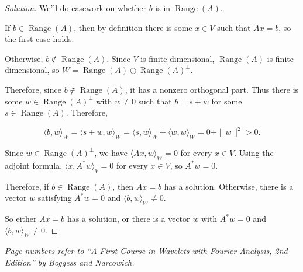 \documentclass[11pt]{article}
\newcommand{\1}{\mathbf{1}}
\theoremstyle{definition}
\newenvironment{solution}{\begin{proof}[Solution]}{\end{proof}}
\begin{document}
\begin{solution}
We'll do casework on whether $b$ is in $\operatorname{Range}(A)$.

\par If $b\in\operatorname{Range}(A)$, then by definition there is some $x\in V$ such that $Ax=b$, so the first case holds.

\par Otherwise, $b\notin\operatorname{Range}(A)$. Since $V$ is finite dimensional, $\operatorname{Range}(A)$ is finite dimensional, so $W=\operatorname{Range}(A)\oplus\operatorname{Range}(A)^\perp$.

\par Therefore, since $b\notin\operatorname{Range}(A)$, it has a nonzero orthogonal part. Thus there is some $w\in\operatorname{Range}(A)^\perp$ with $w\neq0$ such that $b=s+w$ for some $s\in\operatorname{Range}(A)$. Therefore,

\[
\langle b,w\rangle_W
=
\langle s+w,w\rangle_W
=
\langle s,w\rangle_W+\langle w,w\rangle_W
=
0+\|w\|^2
>
0.
\]

\par Since $w\in\operatorname{Range}(A)^\perp$, we have $\langle Ax,w\rangle_W=0$ for every $x\in V$. Using the adjoint formula, $\langle x,A^*w\rangle_V=0$ for every $x\in V$, so $A^*w=0$.

\par Therefore, if $b\in\operatorname{Range}(A)$, then $Ax=b$ has a solution. Otherwise, there is a vector $w$ satisfying $A^*w=0$ and $\langle b,w\rangle_W\ne0$.

\par So either $Ax=b$ has a solution, or there is a vector $w$ with $A^*w=0$ and $\langle b,w\rangle_W\ne0$.
\end{solution}

\medskip
\noindent\textit{Page numbers refer to ``A First Course in Wavelets with Fourier Analysis, 2nd Edition'' by Boggess and Narcowich.}
\end{document}
